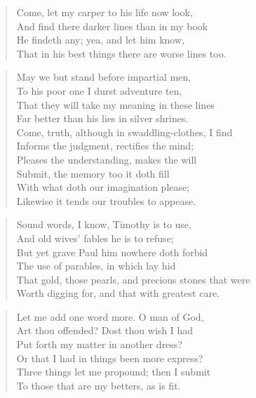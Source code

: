 \begin{verse}
Come, let my carper to his life now look,\\
And find there darker lines than in my book\\
He findeth any; yea, and let him know,\\
That in his best things there are worse lines too.\\
\end{verse}
\begin{verse}
May we but stand before impartial men,\\
To his poor one I durst adventure ten,\\
That they will take my meaning in these lines\\
Far better than his lies in silver shrines.\\
Come, truth, although in swaddling-clothes, I find\\
Informs the judgment, rectifies the mind;\\
Pleases the understanding, makes the will\\
Submit, the memory too it doth fill\\
With what doth our imagination please;\\
Likewise it tends our troubles to appease.\\
\end{verse}
\begin{verse}
Sound words, I know, Timothy is to use,\\
And old wives' fables he is to refuse;\\
But yet grave Paul him nowhere doth forbid\\
The use of parables, in which lay hid\\
That gold, those pearls, and precious stones that were\\
Worth digging for, and that with greatest care.\\
\end{verse}
\begin{verse}
Let me add one word more. O man of God,\\
Art thou offended? Dost thou wish I had\\
Put forth my matter in another dress?\\
Or that I had in things been more express?\\
Three things let me propound; then I submit\\
To those that are my betters, as is fit.\\
\end{verse}
